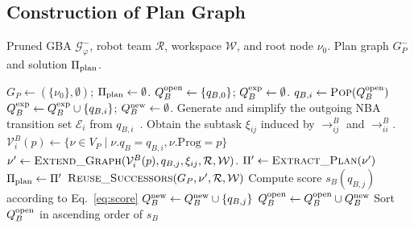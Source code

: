 \documentclass[lettersize,journal]{IEEEtran}
\theoremstyle{italiclemma}
\theoremstyle{italiclemma}
\theoremstyle{definition}
\begin{document}
\subsection{Construction of Plan Graph}  %
\begin{algorithm}[t]
\caption{\textsc{ConstructPlanGraph}}
\label{alg:otf_pg}
\begin{algorithmic}[1]
\REQUIRE Pruned GBA $\mathcal{G}^{-}_\varphi$, robot team $\mathcal R$, workspace $\mathcal W$, and root node $\nu_0$.
\ENSURE Plan graph $G_P^{-}$ and solution $\Pi_{\rm plan}$.

\STATE $G_P\gets(\{\nu_0\},\emptyset)$; $\Pi_{\rm plan}\gets\emptyset$.
\STATE  $Q_B^{\rm open} \leftarrow \{q_{B,0}\}$;
        $Q_B^{\rm exp}\gets\emptyset$.
    \STATE $q_{B,i}\leftarrow\textsc{Pop}(Q_B^{\rm open})$
    \STATE $Q_B^{\rm exp}\gets Q_B^{\rm exp}\cup\{q_{B,i}\}$; $Q_B^{\rm new}\leftarrow\emptyset$.
    \STATE Generate and simplify the outgoing NBA transition set $\mathcal{E}_i$ from $q_{B,i}$~\cite{Gastin2001FastLT}.
    \STATE Obtain the subtask $\xi_{ij}$ induced by $\rightarrow^B_{ij}$ and  $\rightarrow^B_{ii}$.
    \STATE $\mathcal V^B_i(p) \gets\{\nu\in V_P\mid \nu.q_B=q_{B,i}, \nu.\mathrm{Prog}=p\}$
        \STATE $\nu'\gets \textsc{Extend\_Graph}(\mathcal V^B_i(p),q_{B,j},\xi_{ij}, \mathcal R,\mathcal W)$.
                \STATE {}
            \ENDIF
                \STATE $\Pi'\leftarrow\textsc{Extract\_Plan}(\nu')$
                    \STATE $\Pi_{\rm plan}\leftarrow\Pi'$
                \ENDIF
                \STATE {}
            \ENDIF
                 \STATE $\textsc{Reuse\_Successors}
                 (G_P,\nu',\mathcal R,\mathcal W)$
          \ELSE
            \STATE Compute score ${s}_B(q_{B,j})$  according to Eq.~\eqref{eq:score}
            \STATE $Q_B^{\rm new}\gets Q_B^{\rm new}\cup\{q_{B,j}\}$
           \ENDIF
        \ENDFOR
        \ENDFOR
        \STATE $Q_B^{\rm open}\gets Q_B^{\rm open}\cup Q_B^{\rm new}$
        \STATE Sort $Q_B^{\rm open}$ in ascending order of $s_B$


\end{algorithmic}
\end{algorithm}
\end{document}
